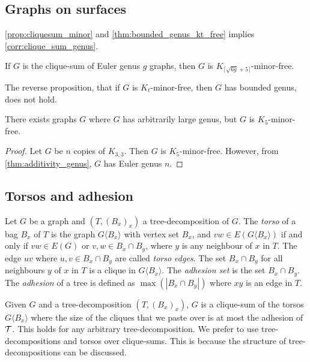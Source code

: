\subsection{Graphs on surfaces}

\cref{prop:cliquesum_minor} and \cref{thm:bounded_genus_kt_free} implies \cref{corr:clique_sum_genus}.
\begin{corollary}\label{corr:clique_sum_genus}
	If \(G\) is the clique-sum of Euler genus \(g\) graphs, then \(G\) is \(K_{\lceil \sqrt{6g} + 5 \rceil}\)-minor-free.
\end{corollary}
The reverse proposition, that if $G$ is $K_t$-minor-free, then $G$ has bounded genus, does not hold.
\begin{proposition}\label{prop:k5_large_genus}
	There exists graphs $G$ where \(G\) has arbitrarily large genus, but $G$ is \(K_{5}\)-minor-free.
\end{proposition}

\begin{proof}
	Let $G$ be $n$ copies of $K_{3,3}$. Then $G$ is $K_5$-minor-free. However, from \cref{thm:additivity_genus}, $G$ has Euler genus $n$. 
\end{proof}

\subsection{Torsos and adhesion}\label{sssec:Torsos and Adhesion}
Let \(G\) be a graph and \((T, (B_x)_x)\) a tree-decomposition of $G$. The \textit{torso} of a bag \(B_x\) of \(T\) is the graph \(G\langle B_x \rangle\) with vertex set $B_x$, and \(vw \in E(G\langle B_x \rangle)\) if and only if $vw \in E(G)$ or \(v,w \in B_x \cap B_y\), where \(y\) is any neighbour of \(x\) in \(T\). The edge $uv$ where $u,v \in B_x \cap B_y$ are called \textit{torso edges}. The set \(B_x \cap B_y\) for all neighbours \(y\) of \(x\) in \(T\) is a clique in \(G\langle B_x \rangle\).
The \textit{adhesion set} is the set \(B_x \cap B_y\). 
The \textit{adhesion} of a tree is defined as \(\max(|B_x \cap B_y|)\) where \(xy\) is an edge in \(T\).

Given \(G\) and a tree-decomposition \((T, (B_x)_x)\), \(G\) is a clique-sum of the torsos \(G\langle B_x \rangle\) where the size of the cliques that we paste over is at most the adhesion of $\mathcal{T}$. This holds for any arbitrary tree-decomposition.
We prefer to use tree-decompositions and torsos over clique-sums. This is because the structure of tree-decompositions can be discussed.

